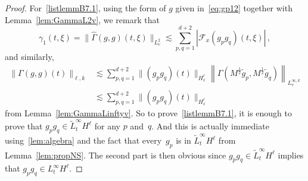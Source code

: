 \begin{proof}
For~\eqref{listlemmB7.1}, using the form of $g$ given in~\eqref{eq:gp12} together with Lemma~\ref{lem:GammaL2v}, we remark that
\begin{equation}\label{lem:hatGamma(i)}
\gamma_1(t,\xi) = \big\| \widehat {\Gamma}(g,g)({t},\xi)\big\|_{L^2_v} \lesssim \sum_{p,q=1}^{d+2} |\mathcal{F}_x({g_{p }g_{q }})(t,\xi)| \,,
\end{equation}
and similarly,
\begin{equation}\label{lem:hatGamma(i)bis}
\begin{aligned}
\|\Gamma(g,g)(t)\|_{\ell,k} &\lesssim \sum_{p,q=1}^{d+2} \|(g_pg_q)(t)\|_{H^\ell_x} \left\|\Gamma\left(M^{\frac12} \widetilde g_p, M^{\frac12} \widetilde g_q\right)\right\|_{L^{\infty,k}_v} \\
&\lesssim \sum_{p,q=1}^{d+2} \|(g_pg_q)(t)\|_{H^\ell_x}
\end{aligned}
\end{equation}
from Lemma~\ref{lem:GammaLinftyv}. So to prove~\eqref{listlemmB7.1}, it is enough to prove that $g_pg_q \in \tilde L^\infty_tH^\ell $ for any $p$ and~$q$. And this is actually immediate using~\eqref{lem:algebra} and the fact that every~$g_{p} $ is in $\tilde L^\infty_tH^\ell$ from Lemma~\ref{lem:propNS}. {The second part is then obvious since $g_pg_q \in \tilde L^\infty_tH^\ell $ implies that $g_pg_q \in L^\infty_tH^\ell$.}



\end{proof}

